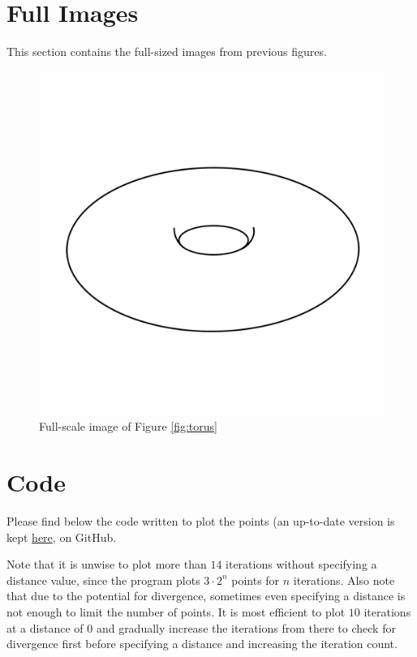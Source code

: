 \documentclass[12pt,a4paper,reqno,parskip=full]{amsart}
\numberwithin{equation}{section}
\theoremstyle{plain}
\theoremstyle{definition}
\begin{document}
\section{Full Images}

This section contains the full-sized images from previous figures.

\begin{figure}[H]
    \centering
    \includegraphics[width=\textwidth]{images/plain torus.jpg}
    \caption{Full-scale image of Figure \ref{fig:torus}}
\end{figure}

\section{Code}
Please find below the code written to plot the points (an up-to-date version is kept \href{https://github.com/scerbone121/ma499report/blob/main/circles3.py}{here}, on GitHub.

Note that it is unwise to plot more than $14$ iterations without specifying a distance value, since the program plots $3\cdot2^n$ points for $n$ iterations. Also note that due to the potential for divergence, sometimes even specifying a distance is not enough to limit the number of points. It is most efficient to plot $10$ iterations at a distance of $0$ and gradually increase the iterations from there to check for divergence first before specifying a distance and increasing the iteration count. 



\newpage


\newpage
\listoffigures
\end{document}
